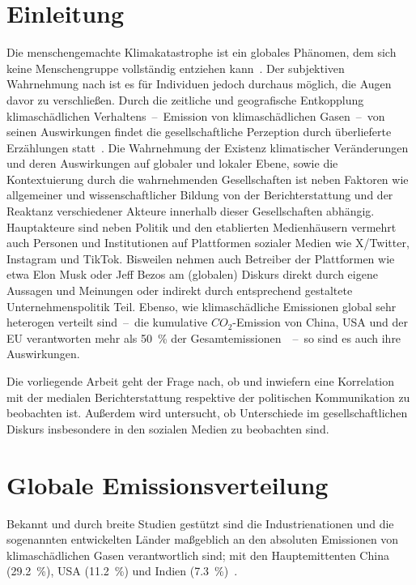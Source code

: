 \section{Einleitung}

Die menschengemachte Klimakatastrophe ist ein globales Phänomen, dem sich keine Menschengruppe vollständig entziehen kann~\cite{Book.Calvin.IPCCClimateChange2023SynthesisReport.2023}.
Der subjektiven Wahrnehmung nach ist es für Individuen jedoch durchaus möglich, die Augen davor zu verschließen. %
Durch die zeitliche und geografische Entkopplung klimaschädlichen Verhaltens~--~Emission von klimaschädlichen Gasen~--~von seinen Auswirkungen findet die gesellschaftliche Perzeption durch überlieferte Erzählungen statt~\cite{Article.Moser.CommunicatingClimateChangeHistoryChallengesProcessAndFutureDirections.2009}. %
Die Wahrnehmung der Existenz klimatischer Veränderungen und deren Auswirkungen auf globaler und lokaler Ebene, sowie die Kontextuierung durch die wahrnehmenden Gesellschaften ist neben Faktoren wie allgemeiner und wissenschaftlicher Bildung von der Berichterstattung und der Reaktanz verschiedener Akteure innerhalb dieser Gesellschaften abhängig.
Hauptakteure sind neben Politik und den etablierten Medienhäusern vermehrt auch Personen und Institutionen auf Plattformen sozialer Medien wie X/Twitter, Instagram und TikTok.
Bisweilen nehmen auch Betreiber der Plattformen wie etwa Elon Musk oder Jeff Bezos am (globalen) Diskurs direkt durch eigene Aussagen und Meinungen oder indirekt durch entsprechend gestaltete Unternehmenspolitik Teil.
Ebenso, wie klimaschädliche Emissionen global sehr heterogen verteilt sind~--~die kumulative \(CO_2\)-Emission von China, USA und der EU verantworten mehr als \qty{50}{\percent} der Gesamtemissionen~\cite{Misc.Centre.GHGEmissionsOfAllWorldCountries.2023}~--~so sind es auch ihre Auswirkungen.

Die vorliegende Arbeit geht der Frage nach, ob und inwiefern eine Korrelation mit der medialen Berichterstattung respektive der politischen Kommunikation zu beobachten ist.
Außerdem wird untersucht, ob Unterschiede im gesellschaftlichen Diskurs insbesondere in den sozialen Medien zu beobachten sind.

\section{Globale Emissionsverteilung}

Bekannt und durch breite Studien gestützt sind die Industrienationen und die sogenannten entwickelten Länder maßgeblich an den absoluten Emissionen von klimaschädlichen Gasen verantwortlich sind; mit den Hauptemittenten China (\qty{29,2}{\percent}), USA (\qty{11,2}{\percent}) und Indien (\qty{7,3}{\percent})~\cite{Misc.Centre.GHGEmissionsOfAllWorldCountries.2023}.


